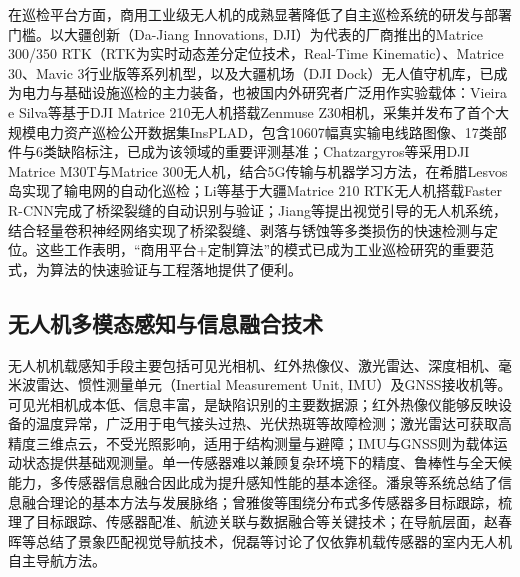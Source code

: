 在巡检平台方面，商用工业级无人机的成熟显著降低了自主巡检系统的研发与部署门槛。以大疆创新（Da-Jiang Innovations, DJI）为代表的厂商推出的Matrice 300/350 RTK（RTK为实时动态差分定位技术，Real-Time Kinematic）、Matrice 30、Mavic 3行业版等系列机型，以及大疆机场（DJI Dock）无人值守机库，已成为电力与基础设施巡检的主力装备，也被国内外研究者广泛用作实验载体：Vieira e Silva等基于DJI Matrice 210无人机搭载Zenmuse Z30相机，采集并发布了首个大规模电力资产巡检公开数据集InsPLAD\cite{vieira2023insplad}，包含10607幅真实输电线路图像、17类部件与6类缺陷标注，已成为该领域的重要评测基准；Chatzargyros等\cite{chatzargyros2024uav}采用DJI Matrice M30T与Matrice 300无人机，结合5G传输与机器学习方法，在希腊Lesvos岛实现了输电网的自动化巡检；Li等\cite{li2022bridge}基于大疆Matrice 210 RTK无人机搭载Faster R-CNN完成了桥梁裂缝的自动识别与验证；Jiang等\cite{jiang2022vision}提出视觉引导的无人机系统，结合轻量卷积神经网络实现了桥梁裂缝、剥落与锈蚀等多类损伤的快速检测与定位。这些工作表明，“商用平台+定制算法”的模式已成为工业巡检研究的重要范式，为算法的快速验证与工程落地提供了便利。

\subsection{无人机多模态感知与信息融合技术}

无人机机载感知手段主要包括可见光相机、红外热像仪、激光雷达、深度相机、毫米波雷达、惯性测量单元（Inertial Measurement Unit, IMU）及GNSS接收机等。可见光相机成本低、信息丰富，是缺陷识别的主要数据源\cite{kanellakis2017survey,spencer2019advances}；红外热像仪能够反映设备的温度异常，广泛用于电气接头过热、光伏热斑等故障检测\cite{jadin2012recent,usamentiaga2014infrared}；激光雷达可获取高精度三维点云，不受光照影响，适用于结构测量与避障\cite{wujq2021review,zhang2014loam}；IMU与GNSS则为载体运动状态提供基础观测量。单一传感器难以兼顾复杂环境下的精度、鲁棒性与全天候能力，多传感器信息融合因此成为提升感知性能的基本途径\cite{panq2003basic,wangj2004survey,hey2000multi}。潘泉等\cite{panq2003basic}系统总结了信息融合理论的基本方法与发展脉络；曾雅俊等\cite{zengyj2023review}围绕分布式多传感器多目标跟踪，梳理了目标跟踪、传感器配准、航迹关联与数据融合等关键技术；在导航层面，赵春晖等\cite{zhaoch2019review}总结了景象匹配视觉导航技术，倪磊等\cite{nil2012review}讨论了仅依靠机载传感器的室内无人机自主导航方法。

